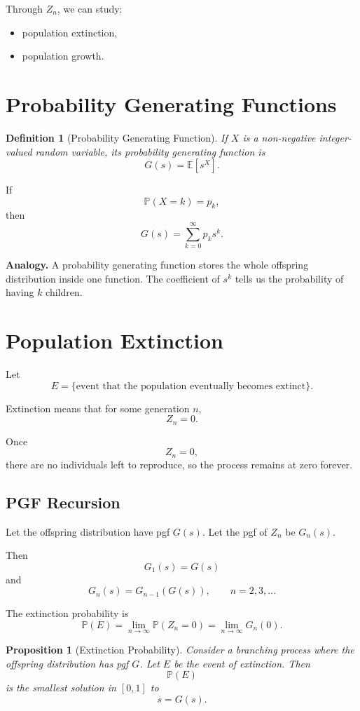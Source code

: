 \documentclass[12pt,a4paper]{article}
\theoremstyle{lecturestyle}
\newtheorem{definition}{Definition}
\newtheorem{proposition}{Proposition}
\newcommand{\Prob}{\mathbb{P}}
\newcommand{\E}{\mathbb{E}}
\begin{document}
Through $Z_n$, we can study:
\begin{itemize}[leftmargin=1.2cm]
    \item population extinction,
    \item population growth.
\end{itemize}

\section{Probability Generating Functions}

\begin{definition}[Probability Generating Function]
If $X$ is a non-negative integer-valued random variable, its probability generating function is
\[
G(s)=\E[s^X].
\]
\end{definition}

If
\[
\Prob(X=k)=p_k,
\]
then
\[
G(s)=\sum_{k=0}^{\infty}p_ks^k.
\]

\textbf{Analogy.} A probability generating function stores the whole offspring distribution inside one function. The coefficient of $s^k$ tells us the probability of having $k$ children.

\section{Population Extinction}

Let
\[
E=\{\text{event that the population eventually becomes extinct}\}.
\]

Extinction means that for some generation $n$,
\[
Z_n=0.
\]

Once
\[
Z_n=0,
\]
there are no individuals left to reproduce, so the process remains at zero forever.

\subsection{PGF Recursion}

Let the offspring distribution have pgf $G(s)$. Let the pgf of $Z_n$ be $G_n(s)$.

Then
\[
G_1(s)=G(s)
\]
and
\[
G_n(s)=G_{n-1}(G(s)),
\qquad n=2,3,\ldots
\]

The extinction probability is
\[
\Prob(E)=\lim_{n\to\infty}\Prob(Z_n=0)
=
\lim_{n\to\infty}G_n(0).
\]

\begin{proposition}[Extinction Probability]
Consider a branching process where the offspring distribution has pgf $G$. Let $E$ be the event of extinction. Then
\[
\Prob(E)
\]
is the smallest solution in $[0,1]$ to
\[
s=G(s).
\]
\end{proposition}
\end{document}
